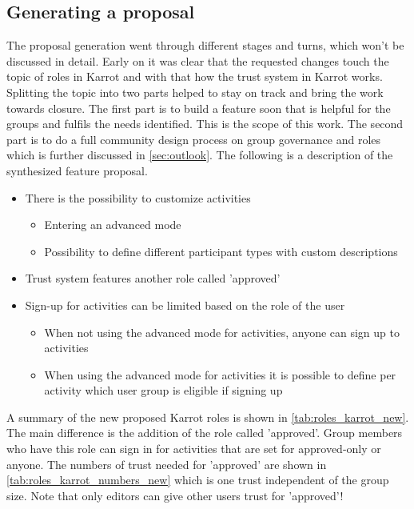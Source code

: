 \documentclass[
	a4paper,%
	11pt,%
	]{article}
\begin{document}
\subsection{Generating a proposal}
	
The proposal generation went through different stages and turns, which won't be discussed in detail. Early on it was clear that the requested changes touch the topic of roles in Karrot and with that how the trust system in Karrot works. Splitting the topic into two parts helped to stay on track and bring the work towards closure. The first part is to build a feature soon that is helpful for the groups and fulfils the needs identified. This is the scope of this work. The second part is to do a full community design process on group governance and roles which is further discussed in \autoref{sec:outlook}. The following is a description of the synthesized feature proposal.


\begin{itemize}
	\item There is the possibility to customize activities
	\begin{itemize}
		\item Entering an advanced mode
		\item Possibility to define different participant types with custom descriptions
	\end{itemize}
	\item Trust system features another role called 'approved'
	\item Sign-up for activities can be limited based on the role of the user
	\begin{itemize}
		\item When not using the advanced mode for activities, anyone can sign up to activities
		\item When using the advanced mode for activities it is possible to define per activity which user group is eligible if signing up
	\end{itemize}
\end{itemize}


A summary of the new proposed Karrot roles is shown in \autoref{tab:roles_karrot_new}. The main difference is the addition of the role called 'approved'. Group members who have this role can sign in for activities that are set for approved-only or anyone. The numbers of trust needed for 'approved' are shown in \autoref{tab:roles_karrot_numbers_new} which is one trust independent of the group size. Note that only editors can give other users trust for 'approved'!
\end{document}
